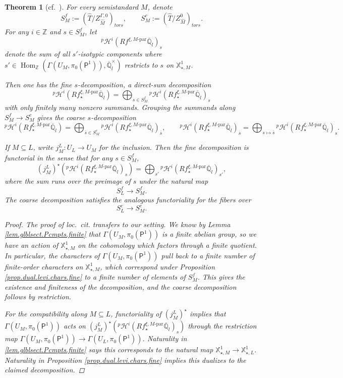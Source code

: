 \documentclass[openany]{amsbook}
\newtheorem{theorem}{Theorem}[chapter]
\theoremstyle{definition}
\theoremstyle{remark}
\numberwithin{equation}{section}
\newcommand{\Q}{\mathbb{Q}}
\newcommand{\Z}{\mathbb{Z}}
\newcommand{\ol}[1]{\overline{#1}}
\renewcommand{\-}{\operatorname{-}}
\newcommand{\Hom}{\operatorname{Hom}}
\newcommand{\pHi}{{}^p \mathcal{H}^i}
\newcommand{\bX}{\mathbb{X}}
\newcommand{\bP}{\mathsf{P}}
\newcommand{\Mpar}{M\text{-par}}
\newcommand{\tors}{\mathit{tors}}
\begin{document}
\begin{theorem}[{{cf.\ \cite[Thm.\ 8.5.1, Cor.\ 8.5.3]{CLII}}}]\label{thm.s.decomp}
    For every semistandard $M$, denote 
    $$
        S^f_M := (\widehat{T}/Z_{\widehat{M}}^{\Gamma,0})_{\tors}, \qquad S^c_M := (\widehat{T}/Z_{\widehat{M}}^0)_{\tors}.
    $$
    For any $i \in \mathbb{Z}$ and $s \in S_M^f$, let 
    $$
        \pHi(Rf^{\xi, \Mpar} \ol{\Q}_l)_{s}
    $$
    denote the sum of all $s'$-isotypic components where $s' \in \Hom_{\Z}(\Gamma(U_M, \pi_0(\bP^{1})), \ol{\Q}_l^\times)$ restricts to $s$ on $\bX_{\star,M}^1$. 

    Then one has the \emph{fine $s$-decomposition}, a direct-sum decomposition
    $$
        \pHi(R f_\star^{\xi, \Mpar} \ol{\Q}_l) = \bigoplus_{s \in S_M^f} \pHi(R f_\star^{\xi, \Mpar} \ol{\Q}_l)_s
    $$
    with only finitely many nonzero summands. Grouping the summands along $S_M^f \to S^c_M$ gives the \emph{coarse $s$-decomposition}
    $$
        \pHi(R f_\star^{\xi, \Mpar} \ol{\Q}_l) = \bigoplus_{\ol{s} \in S_M^c} \pHi(R f_\star^{\xi, \Mpar} \ol{\Q}_l)_{\ol{s}}, \qquad \pHi(R f_\star^{\xi, \Mpar} \ol{\Q}_l)_{\ol{s}} = \bigoplus_{s \mapsto \ol{s}} \pHi(R f_\star^{\xi, \Mpar} \ol{\Q}_l)_{s}.
    $$

    If $M \subseteq L$, write $j_M^L  : U_L \to U_M$ for the inclusion. Then the fine decomposition is functorial in the sense that for any $s \in S^f_M$,
    $$
        (j_M^L)^\star(\pHi(Rf_\star^{\xi, \Mpar} \ol{\Q}_l)_s) = \bigoplus_{s'} \pHi(Rf_\star^{\xi, \Mpar} \ol{\Q}_l)_{s'},
    $$
    where the sum runs over the preimage of $s$ under the natural map 
        $$
        S^f_L \to S^f_M.
        $$
    The coarse decomposition satisfies the analogous functoriality for the fibers over 
    $$
        S^c_L \to S^c_M.
        $$
    
                                                                                                    \begin{proof}
        The proof of \textit{loc.\ cit.} transfers to our setting. We know by Lemma \ref{lem.glblsect.Pcmpts.finite} that $\Gamma(U_M, \pi_0(\bP^{1}))$ is a finite abelian group, so we have an action of $\bX_{\star, M}^1$ on the cohomology which factors through a finite quotient. In particular, the characters of $\Gamma(U_M, \pi_0(\bP^{1}))$ pull back to a finite number of finite-order characters on $\bX_{\star, M}^1$, which correspond under Proposition \ref{prop.dual.levi.chars.fine} to a finite number of elements of $S^f_M$. This gives the existence and finiteness of the decomposition, and the coarse decomposition follows by restriction.

        For the compatibility along $M \subseteq L$, functoriality of $(j_M^L)^\star$ implies that $\Gamma(U_M, \pi_0(\bP^{1}))$ acts on $(j_M^L)^\star(\pHi(Rf_\star^{\xi, \Mpar} \ol{\Q}_l)_s)$ through the restriction map $\Gamma(U_M, \pi_0(\bP^{1})) \to \Gamma(U_L, \pi_0(\bP^{1}))$. Naturality in \ref{lem.glblsect.Pcmpts.finite} says this corresponds to the natural map $\bX_{\star, M}^1 \to \bX_{\star, L}^1$. Naturality in Proposition \ref{prop.dual.levi.chars.fine} implies this dualizes to the claimed decomposition.
    \end{proof}
\end{theorem}
\end{document}
